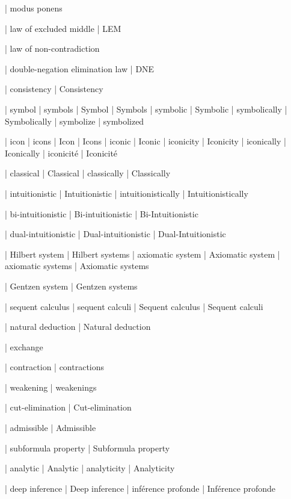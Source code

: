  | modus ponens

 | law of excluded middle
 | LEM

 | law of non-contradiction

 | double-negation elimination law
 | DNE

 | consistency
 | Consistency

 | symbol
 | symbols
 | Symbol
 | Symbols
 | symbolic
 | Symbolic
 | symbolically
 | Symbolically
 | symbolize
 | symbolized

 | icon
 | icons
 | Icon
 | Icons
 | iconic
 | Iconic
 | iconicity
 | Iconicity
 | iconically
 | Iconically
 | iconicité
 | Iconicité
 
 | classical
 | Classical
 | classically
 | Classically

 | intuitionistic
 | Intuitionistic
 | intuitionistically
 | Intuitionistically

 | bi-intuitionistic
 | Bi-intuitionistic
 | Bi-Intuitionistic

 | dual-intuitionistic
 | Dual-intuitionistic
 | Dual-Intuitionistic

 | Hilbert system
 | Hilbert systems
 | axiomatic system
 | Axiomatic system
 | axiomatic systems
 | Axiomatic systems

 | Gentzen system
 | Gentzen systems

 | sequent calculus
 | sequent calculi
 | Sequent calculus
 | Sequent calculi

 | natural deduction
 | Natural deduction

 | exchange

 | contraction
 | contractions

 | weakening
 | weakenings

 | cut-elimination
 | Cut-elimination

 | admissible
 | Admissible

 | subformula property
 | Subformula property

 | analytic
 | Analytic
 | analyticity
 | Analyticity

 | deep inference
 | Deep inference
 | inférence profonde
 | Inférence profonde

